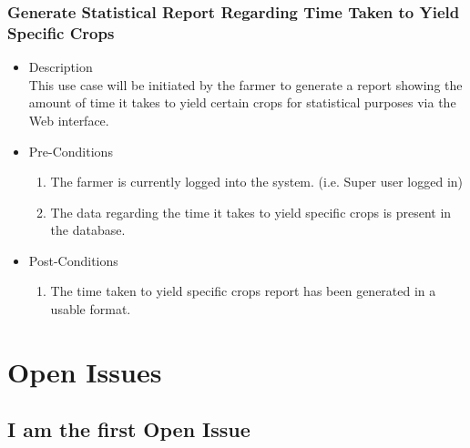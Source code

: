 \documentclass[11pt,fleqn]{book} %
\begin{document}
		\subsection{Generate Statistical Report Regarding Time Taken to Yield Specific Crops}
		\begin{itemize}
			\item Description\\
			This use case will be initiated by the farmer to generate a report showing the amount of time it takes to yield certain crops for statistical purposes via the Web interface.
			\item Pre-Conditions
			\begin{enumerate}
				\item The farmer is currently logged into the system. (i.e. Super user logged in)
				\item The data regarding the time it takes to yield specific crops is present in the database.
			\end{enumerate}
			\item Post-Conditions
			\begin{enumerate}
				\item The time taken to yield specific crops report has been generated in a usable format.
			\end{enumerate}
		\end{itemize}
	


\chapter{Open Issues}

\section{I am the first Open Issue}
\end{document}

